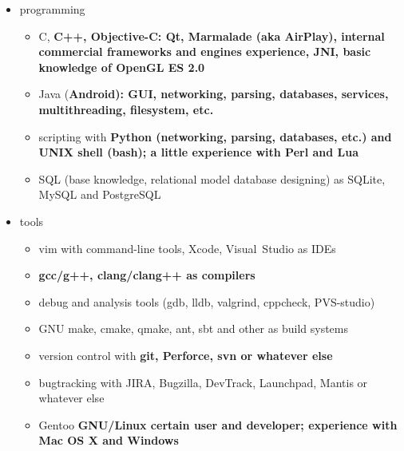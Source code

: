 \begin{itemize}

\item programming

    \begin{itemize}
    \item C, \bfseries C++\mdseries, Objective-C:
    Qt, Marmalade (aka AirPlay), internal commercial frameworks and engines experience,
    \bfseries JNI\mdseries, basic knowledge of OpenGL ES 2.0


    \item Java (\bfseries Android\mdseries):
    GUI, networking, parsing, databases, services, multithreading, filesystem, etc.


    \item scripting with
    \bfseries Python \mdseries (networking, parsing, databases, etc.)
    and
    \bfseries UNIX shell (bash)\mdseries;
    a little experience with
    \bfseries Perl \mdseries and \bfseries Lua\mdseries

    \item SQL (base knowledge, relational model database designing)
as SQLite, MySQL and PostgreSQL
    \end{itemize}

\item tools

    \begin{itemize}
    \item vim with command-line tools, Xcode, Visual~Studio as IDEs
    \item \bfseries gcc/g++\mdseries, clang/clang++ as compilers
    \item debug and analysis tools (gdb, lldb, valgrind, cppcheck, PVS-studio)
    \item GNU make, cmake, qmake, ant, sbt and other as build systems
    \item version control with \bfseries git\mdseries, Perforce, svn or whatever else
    \item bugtracking with JIRA, Bugzilla, DevTrack, Launchpad, Mantis or whatever else
    \item Gentoo \bfseries GNU/Linux \mdseries certain user and developer;
    experience with \bfseries Mac OS X \mdseries and Windows
    \end{itemize}

\end{itemize}

